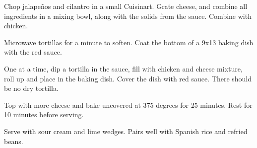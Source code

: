 \begin{recipe}
Chop jalapeños and cilantro in a small Cuisinart. Grate cheese, and combine all ingredients in a mixing bowl, along with the solids from the sauce. Combine with chicken.


Microwave tortillas for a minute to soften. Coat the bottom of a 9x13 baking dish with the red sauce.

One at a time, dip a tortilla in the sauce, fill with chicken and cheese mixture, roll up and place in the baking dish. Cover the dish with red sauce. There should be no dry tortilla.

Top with more cheese and bake uncovered at 375 degrees for 25 minutes. Rest for 10 minutes before serving.

Serve with sour cream and lime wedges. Pairs well with Spanish rice and refried beans.

\end{recipe}
